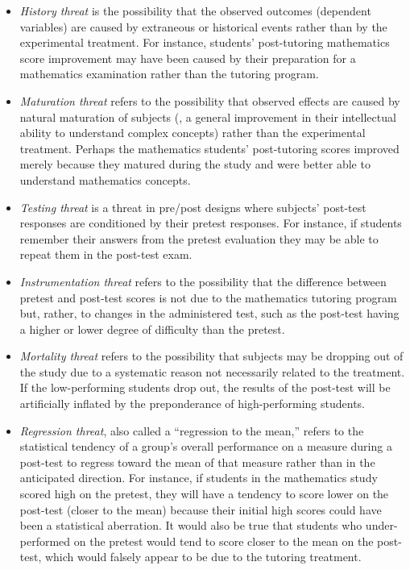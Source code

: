 \begin{itemize}
	\item \textit{History threat} is the possibility that the observed outcomes (dependent variables) are caused by extraneous or historical events rather than by the experimental treatment. For instance, students' post-tutoring mathematics score improvement may have been caused by their preparation for a mathematics examination rather than the tutoring program.
	\item \textit{Maturation threat} refers to the possibility that observed effects are caused by natural maturation of subjects (\eg, a general improvement in their intellectual ability to understand complex concepts) rather than the experimental treatment. Perhaps the mathematics students' post-tutoring scores improved merely because they matured during the study and were better able to understand mathematics concepts.
	\item \textit{Testing threat} is a threat in pre/post designs where subjects' post-test responses are conditioned by their pretest responses. For instance, if students remember their answers from the pretest evaluation they may be able to repeat them in the post-test exam.
	\item \textit{Instrumentation threat} refers to the possibility that the difference between pretest and post-test scores is not due to the mathematics tutoring program but, rather, to changes in the administered test, such as the post-test having a higher or lower degree of difficulty than the pretest.
	\item \textit{Mortality threat} refers to the possibility that subjects may be dropping out of the study due to a systematic reason not necessarily related to the treatment. If the low-performing students drop out, the results of the post-test will be artificially inflated by the preponderance of high-performing students.
	\item \textit{Regression threat}, also called a ``regression to the mean,'' refers to the statistical tendency of a group's overall performance on a measure during a post-test to regress toward the mean of that measure rather than in the anticipated direction. For instance, if students in the mathematics study scored high on the pretest, they will have a tendency to score lower on the post-test (closer to the mean) because their initial high scores could have been a statistical aberration. It would also be true that students who under-performed on the pretest would tend to score closer to the mean on the post-test, which would falsely appear to be due to the tutoring treatment.
\end{itemize}

